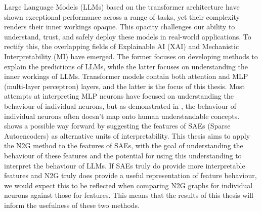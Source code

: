 \documentclass[../main.tex]{subfiles}
\begin{document}
Large Language Models (LLMs) based on the transformer architecture \citep{vaswani_attention_2023} have shown exceptional performance across a range of tasks, yet their complexity renders their inner workings opaque.
This opacity challenges our ability to understand, trust, and safely deploy these models in real-world applications.
To rectify this, the overlapping fields of Explainable AI (XAI) and Mechanistic Interpretability (MI) have emerged.
The former focuses on developing methods to explain the predictions of LLMs, while the latter focuses on understanding the inner workings of LLMs.
Transformer models contain both attention and MLP (multi-layer perceptron) layers, and the latter is the focus of this thesis.
Most attempts at interpreting MLP neurons have focused on understanding the behaviour of individual neurons, but as demonstrated in \citet{elhage_toy_2022}, the behaviour of individual neurons often doesn't map onto human understandable concepts.
\citet{bricken_towards_2023} shows a possible way forward by suggesting the features of SAEs (Sparse Autoencoders) as alternative units of interpretability.
This thesis aims to apply the N2G \citep{foote_neuron_2023} method to the features of SAEs, with the goal of understanding the behaviour of these features and the potential for using this understanding to interpret the behaviour of LLMs.
If SAEs truly do provide more interpretable features and N2G truly does provide a useful representation of feature behaviour, we would expect this to be reflected when comparing N2G graphs for individual neurons against those for features. 
This means that the results of this thesis will inform the usefulness of these two methods.

\subbib
\end{document}
